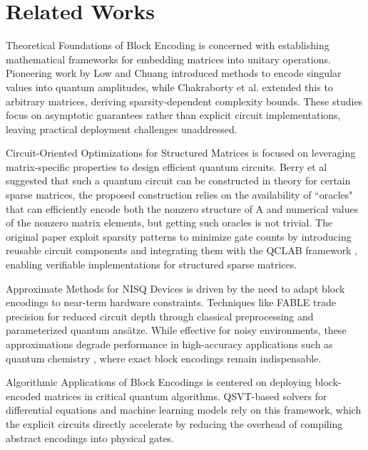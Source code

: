 \documentclass{article}
\begin{document}
    \section{Related Works}

    \label{sec:related_works}

    Theoretical Foundations of Block Encoding is concerned with establishing mathematical frameworks for embedding matrices into unitary operations. Pioneering work by Low and Chuang\cite{low2017optimal}
    introduced methods to encode singular values into quantum amplitudes, while Chakraborty et al.\cite{chakraborty2018power}
    extended this to arbitrary matrices, deriving sparsity-dependent complexity bounds. These studies focus on asymptotic guarantees rather than explicit circuit implementations, leaving practical deployment challenges unaddressed.

    Circuit-Oriented Optimizations for Structured Matrices is focused on leveraging matrix-specific properties to design efficient quantum circuits.
    Berry et al \cite{berry2015hamiltonian} suggested that such a quantum circuit can
    be constructed in theory for certain sparse matrices, the proposed construction relies on the availability of “oracles" that
    can efficiently encode both the nonzero structure of A and numerical values of the nonzero matrix elements, but getting such oracles is not trivial.
    The original paper exploit sparsity patterns to minimize gate counts by introducing reusable circuit components and integrating them with the QCLAB framework
    , enabling verifiable implementations for structured sparse matrices.

    Approximate Methods for NISQ Devices is driven by the need to adapt block encodings to near-term hardware constraints. Techniques like FABLE \cite{camps2022fable}
    trade precision for reduced circuit depth through classical preprocessing and parameterized quantum ansätze. While effective for noisy environments, these approximations degrade performance in high-accuracy applications such as quantum chemistry
    , where exact block encodings remain indispensable.

    Algorithmic Applications of Block Encodings is centered on deploying block-encoded matrices in critical quantum algorithms. QSVT-based solvers \cite{Gilyen2019}for differential equations
    and machine learning models rely on this framework, which the explicit circuits directly accelerate by reducing the overhead of compiling abstract encodings into physical gates.
\end{document}

